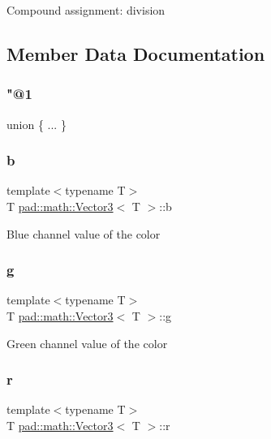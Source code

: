 Compound assignment\+: division 

\subsection{Member Data Documentation}
\mbox{\label{structpad_1_1math_1_1_vector3_a85cf7a3b4a5c570cfb3139ef228f65ab}} 
\subsubsection{\texorpdfstring{"@1}{@1}}
{\footnotesize\ttfamily union \{ ... \} }

\mbox{\label{structpad_1_1math_1_1_vector3_afaba266e93b4c9f0a14048934ac2f3f6}} 
\subsubsection{\texorpdfstring{b}{b}}
{\footnotesize\ttfamily template$<$typename T$>$ \\
T \mbox{\hyperlink{structpad_1_1math_1_1_vector3}{pad\+::math\+::\+Vector3}}$<$ T $>$\+::b}

Blue channel value of the color \mbox{\label{structpad_1_1math_1_1_vector3_ab0c584460b01a899fe4504c48c2037e4}} 
\subsubsection{\texorpdfstring{g}{g}}
{\footnotesize\ttfamily template$<$typename T$>$ \\
T \mbox{\hyperlink{structpad_1_1math_1_1_vector3}{pad\+::math\+::\+Vector3}}$<$ T $>$\+::g}

Green channel value of the color \mbox{\label{structpad_1_1math_1_1_vector3_a605d25418ec0079b504fcec127e7bea4}} 
\subsubsection{\texorpdfstring{r}{r}}
{\footnotesize\ttfamily template$<$typename T$>$ \\
T \mbox{\hyperlink{structpad_1_1math_1_1_vector3}{pad\+::math\+::\+Vector3}}$<$ T $>$\+::r}

